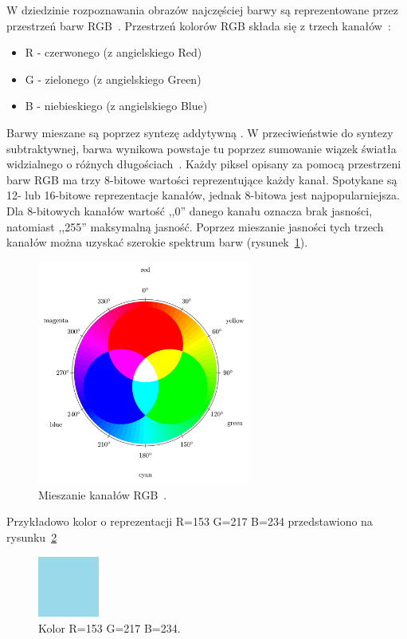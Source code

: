 \documentclass[a4paper,twoside,12pt]{book}
\begin{document}
    W dziedzinie rozpoznawania obrazów najczęściej barwy są reprezentowane przez przestrzeń barw
    RGB~\cite{przestrzenieKolorow}.
    Przestrzeń kolorów RGB składa się z trzech kanałów~\cite{kolory}:
    \begin{itemize}
        \item R - czerwonego (z angielskiego Red)
        \item G - zielonego (z angielskiego Green)
        \item B - niebieskiego (z angielskiego Blue)
    \end{itemize}
    Barwy mieszane są poprzez syntezę addytywną .
    W przeciwieństwie do syntezy subtraktywnej, barwa wynikowa powstaje tu poprzez sumowanie wiązek światła widzialnego o
    różnych długościach~\cite{przestrzenieKolorow}.
    Każdy piksel opisany za pomocą przestrzeni barw RGB ma trzy 8-bitowe wartości reprezentujące każdy kanał.
    Spotykane
    są 12- lub 16-bitowe reprezentacje kanałów, jednak 8-bitowa jest najpopularniejsza.
    Dla 8-bitowych kanałów
    wartość ,,0''
    danego kanału oznacza brak jasności, natomiast ,,255'' maksymalną jasność.
    Poprzez mieszanie jasności tych trzech kanałów
    można uzyskać szerokie spektrum barw (rysunek~\ref{fig.mieszanieKolorow}).

    \begin{figure}[h!]
        \centering
        \includegraphics[width=7cm]{Obrazy/mieszanieKolorow.jpg}
        \caption{Mieszanie kanałów RGB~\cite{colorMixing}.}
        \label{fig.mieszanieKolorow}
    \end{figure}

    Przykładowo kolor o reprezentacji R=153 G=217 B=234 przedstawiono na rysunku~\ref{fig.mieszanieKolorowBlekitny}

    \begin{figure}
        \centering
        \includegraphics[width=2cm]{Obrazy/blekitny.jpg}
        \caption{Kolor R=153 G=217 B=234.}
        \label{fig.mieszanieKolorowBlekitny}
    \end{figure}
\end{document}
